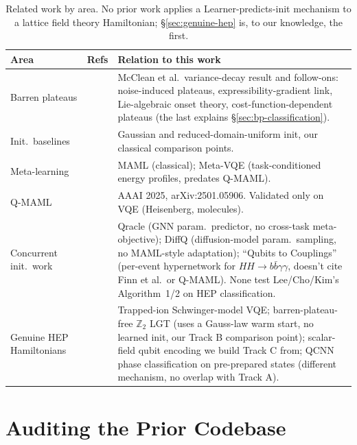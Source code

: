 \documentclass[11pt]{article}
\begin{document}
\begin{table}[ht]
\centering\small
\begin{tabular}{p{}p{}p{}}
\toprule
\textbf{Area} & \textbf{Refs} & \textbf{Relation to this work} \\
\midrule
Barren plateaus & \citep{mcclean2018barren,wang2021noise,holmes2022connecting,ragone2023lie,cerezo2021costfunction} &
McClean et al.\ variance-decay result and follow-ons: noise-induced plateaus, expressibility-gradient link,
Lie-algebraic onset theory, cost-function-dependent plateaus (the last explains \S\ref{sec:bp-classification}). \\
Init.\ baselines & \citep{zhang2022escaping,wang2023trainability} & Gaussian and reduced-domain-uniform
init, our classical comparison points. \\
Meta-learning & \citep{finn2017maml,cerveralierta2021metavqe} & MAML (classical); Meta-VQE
(task-conditioned energy profiles, predates Q-MAML). \\
Q-MAML & \citep{leeqmaml2025} & AAAI 2025, arXiv:2501.05906. Validated only on VQE (Heisenberg, molecules). \\
Concurrent init.\ work & \citep{qracle2025,diffq2025,qubitstocouplings2025} & Qracle (GNN param.\ predictor,
no cross-task meta-objective); DiffQ (diffusion-model param.\ sampling, no MAML-style adaptation);
``Qubits to Couplings'' (per-event hypernetwork for $HH\to b\bar b\gamma\gamma$, doesn't cite Finn et al.\ or
Q-MAML). None test Lee/Cho/Kim's Algorithm~1/2 on HEP classification. \\
Genuine HEP Hamiltonians & \citep{schwingertrappedion2025,z2lgtbp2025,scalarfield2023,quantumdatalearning2023} &
Trapped-ion Schwinger-model VQE; barren-plateau-free $\mathbb{Z}_2$ LGT (uses a Gauss-law warm start, no
learned init, our Track B comparison point); scalar-field qubit encoding we build Track C from; QCNN phase
classification on pre-prepared states (different mechanism, no overlap with Track A). \\
\bottomrule
\end{tabular}
\caption{Related work by area. No prior work applies a Learner-predicts-init mechanism to a lattice field
theory Hamiltonian; \S\ref{sec:genuine-hep} is, to our knowledge, the first.}
\end{table}

\section{Auditing the Prior Codebase}
\label{sec:audit}
\end{document}
